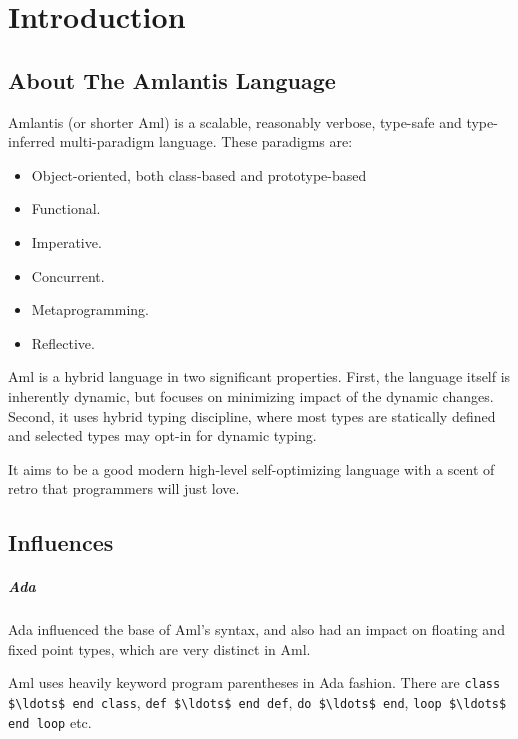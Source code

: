 
\chapter{Introduction}

\minitoc

\newpage


\section{About The Amlantis Language}

Amlantis (or shorter Aml) is a scalable, reasonably verbose, type-safe and type-inferred multi-paradigm language. These paradigms are:
\begin{itemize}
  \item Object-oriented, both class-based and prototype-based
  \item Functional. 
  \item Imperative. 
  \item Concurrent. 
  \item Metaprogramming. 
  \item Reflective. 
\end{itemize}

Aml is a hybrid language in two significant properties. First, the language itself is inherently dynamic, but focuses on minimizing impact of the dynamic changes. Second, it uses hybrid typing discipline, where most types are statically defined and selected types may opt-in for dynamic typing. 

It aims to be a good modern high-level self-optimizing language with a scent of retro that programmers will just love. 






\section{Influences}

\paragraph{Ada}
Ada influenced the base of Aml's syntax, and also had an impact on floating and fixed point types, which are very distinct in Aml. 

Aml uses heavily keyword program parentheses in Ada fashion. There are \lstinline!class $\ldots$ end class!, \lstinline!def $\ldots$ end def!, \lstinline!do $\ldots$ end!, \lstinline!loop $\ldots$ end loop! etc.

